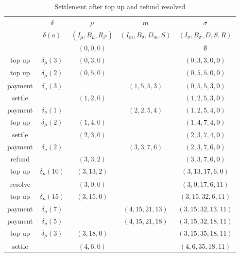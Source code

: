\documentclass{llncs}
\begin{document}
\begin{table}[t]
  \begin{tabularx}{\textwidth}{| S | S | C | C | C |}
       & $\delta$ & $\mu$ & $m$ & $\sigma$ \\ 
       & $\delta(a)$ & $(I_\mu,B_\mu,R_\mathcal{P})$ & $(I_m,B_\sigma,D_m,S)$ & $(I_\sigma,B_\sigma,D,S,R)$ \\
  \hhline{~====}
       & & $(0,0,0)$ & & $\emptyset$ \\ 
      top up  & $\delta_\mu(3)$    & $(0,3,0)$  &                & $(0,3,3,0,0)$ \\
      top up  & $\delta_\mu(2)$    & $(0,5,0)$  &                & $(0,5,5,0,0)$ \\
      payment & $\delta_\sigma(3)$ &            & $(1,5,5,3)$    & $(0,5,5,3,0)$ \\
      settle  &                    & $(1,2,0)$  &                & $(1,2,5,3,0)$ \\
      payment & $\delta_\sigma(1)$ &            & $(2,2,5,4)$    & $(1,2,5,4,0)$ \\
      top up  & $\delta_\mu(2)$    & $(1,4,0)$  &                & $(1,4,7,4,0)$ \\
      settle  &                    & $(2,3,0)$  &                & $(2,3,7,4,0)$ \\
      payment & $\delta_\sigma(2)$ &            & $(3,3,7,6)$    & $(2,3,7,6,0)$ \\
      refund  &                    & $(3,3,2)$  &                & $(3,3,7,6,0)$ \\
      top up  & $\delta_\mu(10)$   & $(3,13,2)$ &                & $(3,13,17,6,0)$ \\
      resolve &                    & $(3,0,0)$  &                & $(3,0,17,6,11)$ \\
      top up  & $\delta_\mu(15)$   & $(3,15,0)$ &                & $(3,15,32,6,11)$ \\
      payment & $\delta_\sigma(7)$ &            & $(4,15,21,13)$ & $(3,15,32,13,11)$ \\
      payment & $\delta_\sigma(5)$ &            & $(4,15,21,18)$ & $(3,15,32,18,11)$ \\
      top up  & $\delta_\mu(3)$    & $(3,18,0)$ &                & $(3,15,35,18,11)$ \\
      settle  &                    & $(4,6,0)$  &                & $(4,6,35,18,11)$ \\
  \end{tabularx}
  \medskip
  \caption{Settlement after top up and refund resolved}
\end{table}
\end{document}
